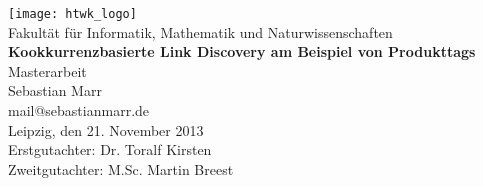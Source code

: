 \thispagestyle{plain}
\begin{titlepage}
\begin{center}
\texttt{[image: htwk\_logo]}\\
\vspace{0.3cm}
\normalsize
Fakultät für Informatik, Mathematik und Naturwissenschaften\\
\vspace{2.3cm}
\huge{\textbf{\textsf{Kookkurrenzbasierte Link Discovery am Beispiel von Produkttags}}}\\
\vspace{1cm}
\LARGE{\textsf{Masterarbeit}}\\
\vspace{2.3cm}
\normalsize
Sebastian Marr\\
mail@sebastianmarr.de\\
Leipzig, den 21. November 2013\\
\vspace{2.3cm}
Erstgutachter: Dr. Toralf Kirsten \\
Zweitgutachter: M.Sc. Martin Breest
\end{center}
\end{titlepage}